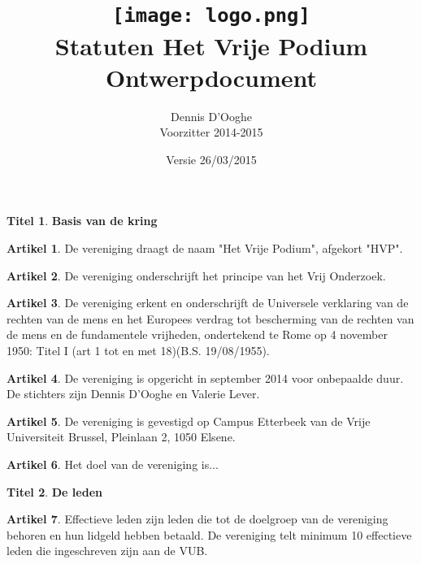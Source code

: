 \documentclass[a4paper,10pt]{article}
\title{\vspace{-2.0cm}\texttt{[image: logo.png]}\\
  \vspace{1cm}Statuten Het Vrije Podium\\Ontwerpdocument}
\author{Dennis D'Ooghe\\Voorzitter 2014-2015}
\date{Versie 26/03/2015} %
\theoremstyle{definition}
\newtheorem{titel}{\large Titel}
\newtheorem{artikel}{\large Artikel}
\newcommand{\ttext}[1]{\large \textbf{#1} \normalsize}
\newcommand{\hnl}{\hfill\newline}
\begin{document}
\maketitle


\begin{titel}\ttext{Basis van de kring}

  \begin{artikel}\hnl
    De vereniging draagt de naam "Het Vrije Podium", afgekort "HVP".
  \end{artikel}

  \begin{artikel}\hnl
    De vereniging onderschrijft het principe van het Vrij Onderzoek.
  \end{artikel}

  \begin{artikel}\hnl
    De vereniging erkent en onderschrijft de Universele verklaring van de rechten van de mens en het Europees verdrag tot bescherming van de rechten van de mens en de fundamentele vrijheden, ondertekend te Rome op 4 november 1950: Titel I (art 1 tot en met 18)(B.S. 19/08/1955).
  \end{artikel}

  \begin{artikel}\hnl
    De vereniging is opgericht in september 2014 voor onbepaalde duur.
    De stichters zijn Dennis D'Ooghe en Valerie Lever.
  \end{artikel}

  \begin{artikel}\hnl
    De vereniging is gevestigd op Campus Etterbeek van de Vrije Universiteit Brussel, Pleinlaan 2, 1050 Elsene.
  \end{artikel}

  \begin{artikel}\hnl
    Het doel van de vereniging is...
  \end{artikel}

\end{titel}


\begin{titel}\ttext{De leden}

  \begin{artikel}\hnl
    Effectieve leden zijn leden die tot de doelgroep van de vereniging behoren en hun lidgeld hebben betaald.
    De vereniging telt minimum 10 effectieve leden die ingeschreven zijn aan de VUB.
  \end{artikel}

\end{titel}
\end{document}
